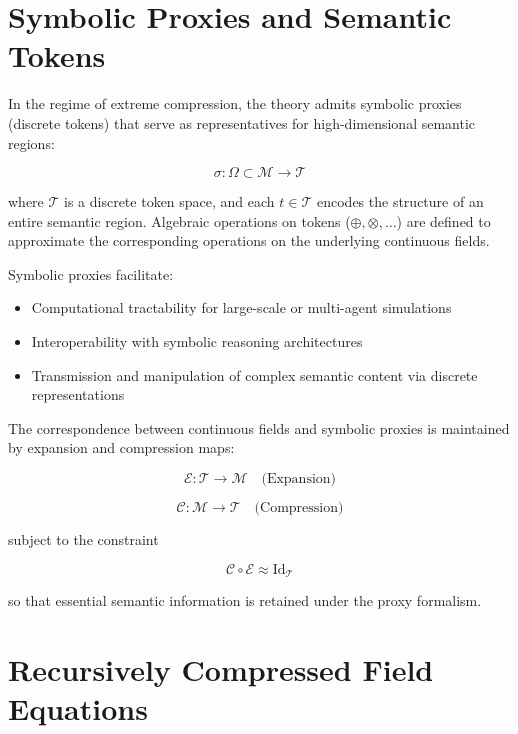 \section{Symbolic Proxies and Semantic Tokens}

In the regime of extreme compression, the theory admits symbolic proxies (discrete tokens) that serve as representatives for high-dimensional semantic regions:

\begin{equation}
\sigma: \Omega \subset \mathcal{M} \to \mathcal{T}
\end{equation}

where \(\mathcal{T}\) is a discrete token space, and each \(t \in \mathcal{T}\) encodes the structure of an entire semantic region. Algebraic operations on tokens (\(\oplus, \otimes, \ldots\)) are defined to approximate the corresponding operations on the underlying continuous fields.

Symbolic proxies facilitate:
\begin{itemize}
    \item Computational tractability for large-scale or multi-agent simulations
    \item Interoperability with symbolic reasoning architectures
    \item Transmission and manipulation of complex semantic content via discrete representations
\end{itemize}

The correspondence between continuous fields and symbolic proxies is maintained by expansion and compression maps:

\begin{equation}
\mathcal{E}: \mathcal{T} \to \mathcal{M} \quad \text{(Expansion)}
\end{equation}

\begin{equation}
\mathcal{C}: \mathcal{M} \to \mathcal{T} \quad \text{(Compression)}
\end{equation}

subject to the constraint

\begin{equation}
\mathcal{C} \circ \mathcal{E} \approx \mathrm{Id}_{\mathcal{T}}
\end{equation}

so that essential semantic information is retained under the proxy formalism.

\section{Recursively Compressed Field Equations}

